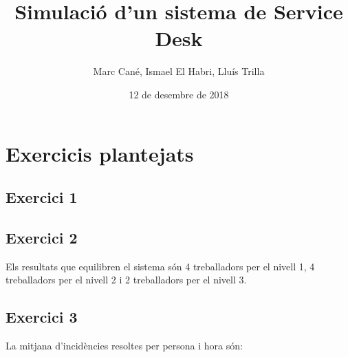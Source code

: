 \documentclass[11pt,a4paper,twoside]{report}
\begin{document}
\title{Simulació d'un sistema de Service Desk}
\author{Marc Cané, Ismael El Habri, Lluís Trilla}
\date{12 de desembre de 2018}
\maketitle

\tableofcontents

\chapter{Exercicis plantejats}

\section{Exercici 1}











\newpage
\section{Exercici 2}
Els resultats que equilibren el sistema són 4 treballadors per el nivell 1, 4 treballadors per el nivell 2 i 2 treballadors per el nivell 3.

\section{Exercici 3}
La mitjana d'incidències resoltes per persona i hora són: 
\end{document}
